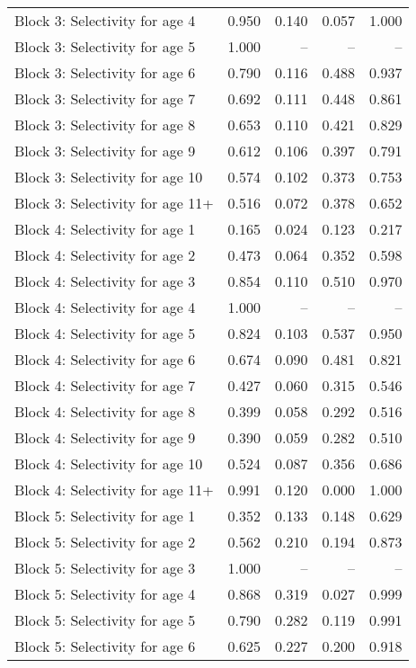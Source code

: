 \documentclass[
]{article}
\begin{document}
\begin{landscape}
\begin{longtable}[t]{lrrrr}
\addlinespace
Block 3: Selectivity for age 4 & 0.950 & 0.140 & 0.057 & 1.000\\
Block 3: Selectivity for age 5 & 1.000 & -- & -- & --\\
Block 3: Selectivity for age 6 & 0.790 & 0.116 & 0.488 & 0.937\\
Block 3: Selectivity for age 7 & 0.692 & 0.111 & 0.448 & 0.861\\
Block 3: Selectivity for age 8 & 0.653 & 0.110 & 0.421 & 0.829\\
\addlinespace
Block 3: Selectivity for age 9 & 0.612 & 0.106 & 0.397 & 0.791\\
Block 3: Selectivity for age 10 & 0.574 & 0.102 & 0.373 & 0.753\\
Block 3: Selectivity for age 11+ & 0.516 & 0.072 & 0.378 & 0.652\\
Block 4: Selectivity for age 1 & 0.165 & 0.024 & 0.123 & 0.217\\
Block 4: Selectivity for age 2 & 0.473 & 0.064 & 0.352 & 0.598\\
\addlinespace
Block 4: Selectivity for age 3 & 0.854 & 0.110 & 0.510 & 0.970\\
Block 4: Selectivity for age 4 & 1.000 & -- & -- & --\\
Block 4: Selectivity for age 5 & 0.824 & 0.103 & 0.537 & 0.950\\
Block 4: Selectivity for age 6 & 0.674 & 0.090 & 0.481 & 0.821\\
Block 4: Selectivity for age 7 & 0.427 & 0.060 & 0.315 & 0.546\\
\addlinespace
Block 4: Selectivity for age 8 & 0.399 & 0.058 & 0.292 & 0.516\\
Block 4: Selectivity for age 9 & 0.390 & 0.059 & 0.282 & 0.510\\
Block 4: Selectivity for age 10 & 0.524 & 0.087 & 0.356 & 0.686\\
Block 4: Selectivity for age 11+ & 0.991 & 0.120 & 0.000 & 1.000\\
Block 5: Selectivity for age 1 & 0.352 & 0.133 & 0.148 & 0.629\\
\addlinespace
Block 5: Selectivity for age 2 & 0.562 & 0.210 & 0.194 & 0.873\\
Block 5: Selectivity for age 3 & 1.000 & -- & -- & --\\
Block 5: Selectivity for age 4 & 0.868 & 0.319 & 0.027 & 0.999\\
Block 5: Selectivity for age 5 & 0.790 & 0.282 & 0.119 & 0.991\\
Block 5: Selectivity for age 6 & 0.625 & 0.227 & 0.200 & 0.918\\

\end{longtable}
\end{landscape}
\end{document}
